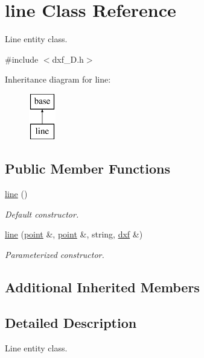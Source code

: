 \hypertarget{classline}{\section{line Class Reference}
\label{classline}
}


Line entity class.  




{\ttfamily \#include $<$dxf\-\_\-D.\-h$>$}

Inheritance diagram for line\-:\begin{figure}[H]
\begin{center}
\leavevmode
\includegraphics[height=2.000000cm]{classline}
\end{center}
\end{figure}
\subsection*{Public Member Functions}
\begin{DoxyCompactItemize}
\item 
\hypertarget{classline_a854d4e37d6dc6af1c7cd08cb801c6c26}{\hyperlink{classline_a854d4e37d6dc6af1c7cd08cb801c6c26}{line} ()}\label{classline_a854d4e37d6dc6af1c7cd08cb801c6c26}

\begin{DoxyCompactList}\small\item\em Default constructor. \end{DoxyCompactList}\item 
\hyperlink{classline_a62c98477491c4da965315766ee662ec8}{line} (\hyperlink{classpoint}{point} \&, \hyperlink{classpoint}{point} \&, string, \hyperlink{classdxf}{dxf} \&)
\begin{DoxyCompactList}\small\item\em Parameterized constructor. \end{DoxyCompactList}\end{DoxyCompactItemize}
\subsection*{Additional Inherited Members}


\subsection{Detailed Description}
Line entity class. 

